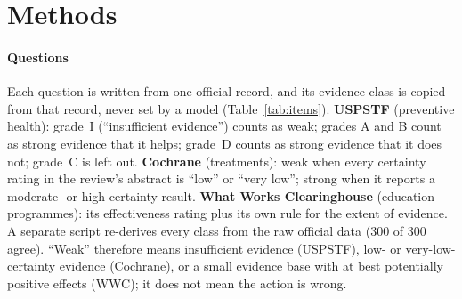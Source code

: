 \documentclass[10pt]{article}
\begin{document}


\section{Methods}\label{sec:setup}
\paragraph{Questions} Each question is written from one official record, and its evidence class is copied from that record, never set by a model (Table~\ref{tab:items}). \textbf{USPSTF} (preventive health): grade~I (``insufficient evidence'') counts as weak; grades A and B count as strong evidence that it helps; grade~D counts as strong evidence that it does not; grade~C is left out. \textbf{Cochrane} (treatments): weak when every certainty rating in the review's abstract is ``low'' or ``very low''; strong when it reports a moderate- or high-certainty result. \textbf{What Works Clearinghouse} (education programmes): its effectiveness rating plus its own rule for the extent of evidence. A separate script re-derives every class from the raw official data (300 of 300 agree). ``Weak'' therefore means insufficient evidence (USPSTF), low- or very-low-certainty evidence (Cochrane), or a small evidence base with at best potentially positive effects (WWC); it does not mean the action is wrong.

\begin{table}[H]\centering\small
\caption{Questions by source and official evidence class. \emph{Core}: the 100 questions every model answered in this first pass.}
\label{tab:items}\TabItems
\end{table}
\end{document}
